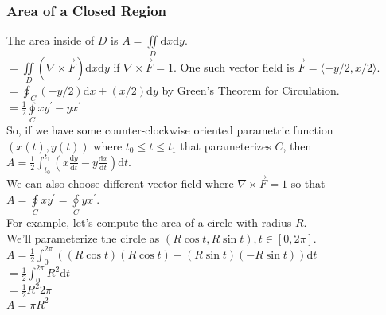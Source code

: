 \subsubsection{Area of a Closed Region}
\noindent
The area inside of $D$ is $A=\iint\limits_{D}{\mathrm{d}x\mathrm{d}y}$.\\
$=\iint\limits_{D}{\left(\nabla\times\vec{F}\right)\mathrm{d}x\mathrm{d}y}$ if $\nabla\times\vec{F}=1$. One such vector field is $\vec{F}=\langle -y/2, x/2\rangle$.\\
$=\oint_{C}{(-y/2)\mathrm{d}x+(x/2)\mathrm{d}y}$ by Green's Theorem for Circulation.\\
$=\frac{1}{2}\oint\limits_{C}{xy^\prime-yx^\prime}$\\
So, if we have some counter-clockwise oriented parametric function $(x(t),y(t))$ where $t_0\leq t\leq t_1$ that parameterizes $C$, then $A=\frac{1}{2}\int_{t_0}^{t_1}{\left(x\frac{\mathrm{d}y}{\mathrm{d}t}-y\frac{\mathrm{d}x}{\mathrm{d}t}\right)\mathrm{d}t}$.\\

\noindent
We can also choose different vector field where $\nabla\times\vec{F}=1$ so that\\ $A=\oint\limits_{C}{xy^\prime}=\oint\limits_{C}{yx^\prime}$.\\

\noindent
For example, let's compute the area of a circle with radius $R$.\\
\indent
We'll parameterize the circle as $(R\cos{t},R\sin{t}),t\in [0,2\pi]$.\\
\indent
$A=\frac{1}{2}\int_{0}^{2\pi}{((R\cos{t})(R\cos{t})-(R\sin{t})(-R\sin{t}))\mathrm{d}t}$\\
\indent
$=\frac{1}{2}\int_{0}^{2\pi}{R^2\mathrm{d}t}$\\
\indent
$=\frac{1}{2}R^2 2\pi$\\
\indent
$A=\pi R^2$